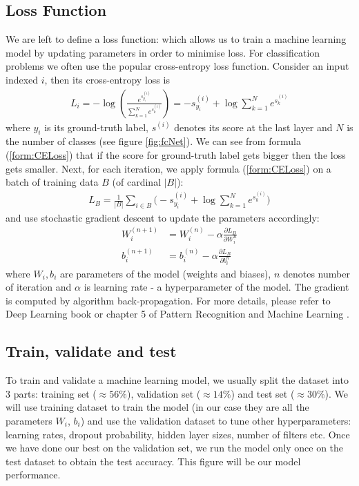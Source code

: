 \subsection{Loss Function}
We are left to define a loss function: which allows us to train a machine learning model by updating parameters in order to minimise loss. For classification problems we often use the popular cross-entropy loss function. Consider an input indexed $i$, then its cross-entropy loss is
\begin{align}
\label{form:CELoss}
L_i = -\log(\frac{e^{s^{(i)}_{y_i}}}{\sum_{k=1}^{N}e^{s^{(i)}_k}}) = -s^{(i)}_{y_i} + \log\sum_{k=1}^{N}e^{s^{(i)}_k}
\end{align}
where $y_i$ is its ground-truth label, $s^{(i)}$ denotes its score at the last layer and $N$ is the number of classes (see figure \ref{fig:fcNet}). We can see from formula (\ref{form:CELoss}) that if the score for ground-truth label gets bigger then the loss gets smaller. Next, for each iteration, we apply formula (\ref{form:CELoss}) on a batch of training data $B$ (of cardinal $|B|$):
\begin{align}
L_B = \frac{1}{|B|}\sum_{i \in B} \bigg(-s^{(i)}_{y_i} + \log\sum_{k=1}^{N}e^{s^{(i)}_k}\bigg)
\end{align}
and use stochastic gradient descent \cite{wiki:SGD} to update the parameters accordingly:
\begin{align}
W^{(n+1)}_i &= W^{(n)}_i - \alpha \frac{\partial L_B}{\partial W^{n}_i}\\
b^{(n+1)}_i &= b^{(n)}_i - \alpha \frac{\partial L_B}{\partial b^{n}_i}
\end{align}
where $W_i, b_i$ are parameters of the model (weights and biases), $n$ denotes number of iteration and $\alpha$ is learning rate - a hyperparameter of the model. The gradient is computed by algorithm back-propagation. For more details, please refer to Deep Learning book \cite{Goodfellow-et-al-2016} or chapter 5 of Pattern Recognition and Machine Learning \cite{Bishop:2006:PRM:1162264}.

\subsection{Train, validate and test}
To train and validate a machine learning model, we usually split the dataset into 3 parts: training set ($\approx56\%$), validation set ($\approx14\%$) and test set ($\approx30\%$). We will use training dataset to train the model (in our case they are all the parameters $W_i$, $b_i$) and use the validation dataset to tune other hyperparameters: learning rates, dropout probability, hidden layer sizes, number of filters etc. Once we have done our best on the validation set, we run the model only once on the test dataset to obtain the test accuracy. This figure will be our model performance. 

